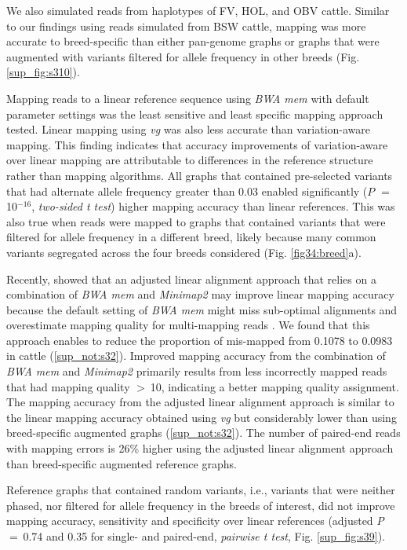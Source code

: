 \documentclass[../main.tex]{subfiles}
\begin{document}
We also simulated reads from haplotypes of FV, HOL, and OBV cattle. Similar to our findings using reads simulated from BSW cattle, mapping was more accurate to breed-specific than either pan-genome graphs or graphs that were augmented with variants filtered for allele frequency in other breeds (Fig. \ref{sup_fig:s310}).

Mapping reads to a linear reference sequence using \emph{BWA mem} with default parameter settings was the least sensitive and least specific mapping approach tested. Linear mapping using \emph{vg} was also less accurate than variation-aware mapping. This finding indicates that accuracy improvements of variation-aware over linear mapping are attributable to differences in the reference structure rather than mapping algorithms. All graphs that contained pre-selected variants that had alternate allele frequency greater than 0.03 enabled significantly ($P$ $=$ 10$^{−16}$, \emph{two-sided t test}) higher mapping accuracy than linear references. This was also true when reads were mapped to graphs that contained variants that were filtered for allele frequency in a different breed, likely because many common variants segregated across the four breeds considered (Fig. \ref{fig34:breed}a).

Recently, \citet{grytten2020assessing} showed that an adjusted linear alignment approach that relies on a combination of \emph{BWA mem} and \emph{Minimap2} \citep{li2018minimap2} may improve linear mapping accuracy because the default setting of \emph{BWA mem} might miss sub-optimal alignments and overestimate mapping quality for multi-mapping reads \citep{grytten2020assessing,li2013aligning}. We found that this approach enables to reduce the proportion of mis-mapped from 0.1078 to 0.0983 in cattle (\ref{sup_not:s32}). Improved mapping accuracy from the combination of \emph{BWA mem} and \emph{Minimap2} primarily results from less incorrectly mapped reads that had mapping quality $>$ 10, indicating a better mapping quality assignment. The mapping accuracy from the adjusted linear alignment approach is similar to the linear mapping accuracy obtained using \emph{vg} but considerably lower than using breed-specific augmented graphs (\ref{sup_not:s32}). The number of paired-end reads with mapping errors is 26\% higher using the adjusted linear alignment approach than breed-specific augmented reference graphs.

Reference graphs that contained random variants, i.e., variants that were neither phased, nor filtered for allele frequency in the breeds of interest, did not improve mapping accuracy, sensitivity and specificity over linear references (adjusted \emph{P} $=$ 0.74 and 0.35 for single- and paired-end, \emph{pairwise t test}, Fig. \ref{sup_fig:s39}).
\end{document}
